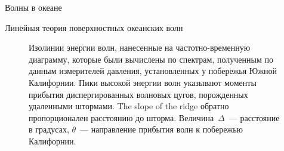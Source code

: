\begin{chapter}{Волны в океане}
\begin{section}{Линейная теория поверхностных океанских волн}
\begin{figure}[t!]
\caption{Изолинии энергии волн, нанесенные на частотно-временную диаграмму,
которые были вычислены по спектрам, полученным по данным измерителей давления,
установленных у побережья Южной Калифорнии. Пики высокой энергии волн
указывают моменты прибытия диспергированных волновых цугов, порожденных 
удаленными штормами. The slope of the ridge обратно пропорционален 
расстоянию до шторма. Величина~$\Delta$~--- расстояние в градусах, 
$\theta$~--- направление прибытия волн к побережью Калифорнии.~\cite{Munk:1963}}
\label{fig:dispersedwaves}
\end{figure}
%


\end{section}
\end{chapter}
